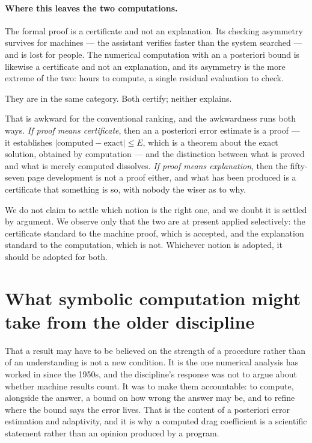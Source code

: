 \documentclass[11pt]{article}
\begin{document}
\paragraph{Where this leaves the two computations.} The formal proof is a certificate and not an
explanation. Its checking asymmetry survives for machines --- the assistant verifies faster than the
system searched --- and is lost for people. The numerical computation with an a posteriori bound is
likewise a certificate and not an explanation, and its asymmetry is the more extreme of the two:
hours to compute, a single residual evaluation to check.

They are in the same category. Both certify; neither explains.

That is awkward for the conventional ranking, and the awkwardness runs both ways. \emph{If proof means
certificate}, then an a posteriori error estimate is a proof --- it establishes
$|\text{computed}-\text{exact}|\le E$, which is a theorem about the exact solution, obtained by
computation --- and the distinction between what is proved and what is merely computed dissolves.
\emph{If proof means explanation}, then the fifty-seven page development is not a proof either, and
what has been produced is a certificate that something is so, with nobody the wiser as to why.

We do not claim to settle which notion is the right one, and we doubt it is settled by argument. We
observe only that the two are at present applied selectively: the certificate standard to the machine
proof, which is accepted, and the explanation standard to the computation, which is not. Whichever
notion is adopted, it should be adopted for both.

\section{What symbolic computation might take from the older discipline}\label{sec:take}

That a result may have to be believed on the strength of a procedure rather than of an understanding
is not a new condition. It is the one numerical analysis has worked in since the 1950s, and the
discipline's response was not to argue about whether machine results count. It was to make them
accountable: to compute, alongside the answer, a bound on how wrong the answer may be, and to refine
where the bound says the error lives. That is the content of a posteriori error estimation and
adaptivity, and it is why a computed drag coefficient is a scientific statement rather than an
opinion produced by a program.
\end{document}
